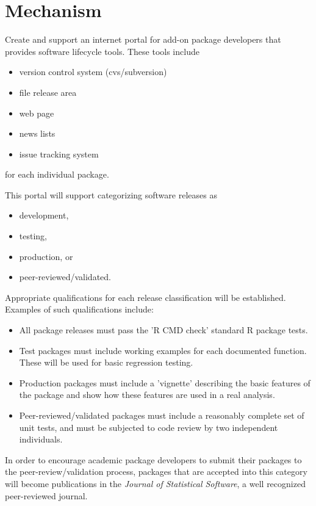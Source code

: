 \documentclass[12pt]{article}
\begin{document}
\section{Mechanism}

Create and support an internet portal for add-on package developers
that provides software lifecycle tools.  These tools include
\begin{itemize}
\item version control system (cvs/subversion)
\item file release area
\item web page
\item news lists
\item issue tracking system
\end{itemize} for each individual package.

This portal will support categorizing software releases as
\begin{itemize}
\item development,
\item testing,
\item production, or
\item peer-reviewed/validated.
\end{itemize}

Appropriate qualifications for each release classification will be
established.  Examples of such qualifications include:
\begin{itemize}
\item All package releases must pass the 'R CMD check'
  standard R package tests.
\item Test packages must include working examples for each documented
  function.  These will be used for basic regression testing.
\item Production packages must include a 'vignette' describing the
  basic features of the package and show how these features are used
  in a real analysis.
\item Peer-reviewed/validated packages must include a reasonably
  complete set of unit tests, and must be subjected to code review by
  two independent individuals.
\end{itemize}

In order to encourage academic package developers to submit their
packages to the peer-review/validation process, packages that are
accepted into this category will become publications in the
\emph{Journal of Statistical Software}, a well recognized
peer-reviewed journal.
\end{document}
